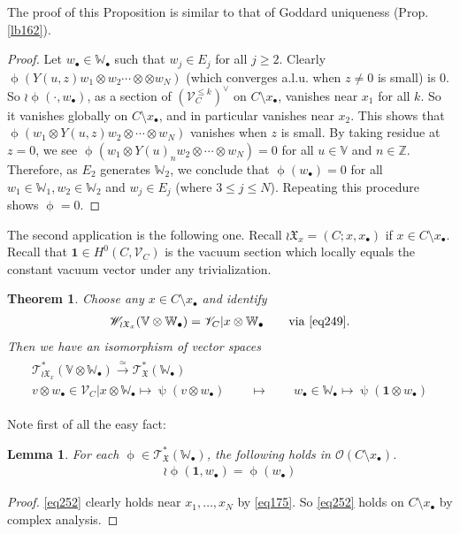 \documentclass[12pt,a4paper,notitlepage]{article}
\theoremstyle{definition}
\theoremstyle{plain}
\newtheorem{thm}[df]{Theorem}
\newtheorem{lm}[df]{Lemma}
\newcommand{\fk}{\mathfrak}
\newcommand{\id}{\mathbf{1}}
\newcommand{\scr}{\mathscr}
\newcommand{\blt}{\bullet}
\newcommand{\Vbb}{\mathbb V}
\newcommand{\Wbb}{\mathbb W}
\newcommand{\Zbb}{\mathbb Z}
\numberwithin{equation}{section}
\begin{document}
The proof of this Proposition is similar to that of Goddard uniqueness (Prop. \ref{lb162}).

\begin{proof}
Let $w_\blt\in\Wbb_\blt$ such that $w_j\in E_j$ for all $j\geq 2$. Clearly $\upphi(Y(u,z)w_1\otimes w_2\cdots\otimes \otimes w_N)$ (which converges a.l.u. when $z\neq 0$ is small) is $0$. So $\wr\upphi(\cdot,w_\blt)$, as a section of $(\scr V_C^{\leq k})^\vee$ on $C\setminus x_\blt$, vanishes near $x_1$ for all $k$. So it vanishes globally on $C\setminus x_\blt$, and  in particular vanishes near $x_2$. This shows that $\upphi(w_1\otimes Y(u,z)w_2\otimes \cdots\otimes w_N)$ vanishes when $z$ is small. By taking residue at $z=0$, we see $\upphi(w_1\otimes Y(u)_nw_2\otimes\cdots\otimes w_N)=0$ for all $u\in\Vbb$ and $n\in\Zbb$. Therefore, as $E_2$ generates $\Wbb_2$, we conclude that $\upphi(w_\blt)=0$ for all $w_1\in\Wbb_1,w_2\in\Wbb_2$ and $w_j\in E_j$ (where $3\leq j\leq N$). Repeating this procedure shows $\upphi=0$.
\end{proof}




The second application is the following one. Recall $\wr\fk X_x=(C;x,x_\blt)$ if $x\in C\setminus x_\blt$. Recall that $\id\in H^0(C,\scr V_C)$ is the vacuum section which locally equals the constant vacuum vector under any trivialization. 





\begin{thm}\label{lb166}
Choose any $x\in C\setminus x_\blt$ and identify 
\begin{gather*}
\scr W_{\wr\fk X_x}(\Vbb\otimes \Wbb_\blt)=\scr V_C|x\otimes\Wbb_\blt\qquad\text{via }\eqref{eq249}.
\end{gather*}
Then we have an isomorphism of vector spaces
\begin{gather}\label{eq251}
\begin{gathered}
\scr T_{\wr\fk X_x}^*(\Vbb\otimes\Wbb_\blt)\xrightarrow{\simeq}\scr T_{\fk X}^*(\Wbb_\blt)\\
\boxed{v\otimes w_\blt\in\scr V_C|x\otimes\Wbb_\blt\mapsto\uppsi(v\otimes w_\blt)}\qquad\mapsto \qquad \boxed{w_\blt\in \Wbb_\blt\mapsto \uppsi(\id\otimes w_\blt)}  
\end{gathered}
\end{gather}
\end{thm}

Note first of all the easy fact:

\begin{lm}\label{lb168}
For each $\upphi\in\scr T_{\fk X}^*(\Wbb_\blt)$, the following holds in $\scr O(C\setminus x_\blt)$.
\begin{align}
\wr\upphi(\id,w_\blt)=\upphi(w_\blt)\label{eq252}
\end{align}
\end{lm}
\begin{proof}
\eqref{eq252} clearly holds near $x_1,\dots,x_N$ by \eqref{eq175}. So \eqref{eq252} holds on $C\setminus x_\blt$ by complex analysis.
\end{proof}
\end{document}
